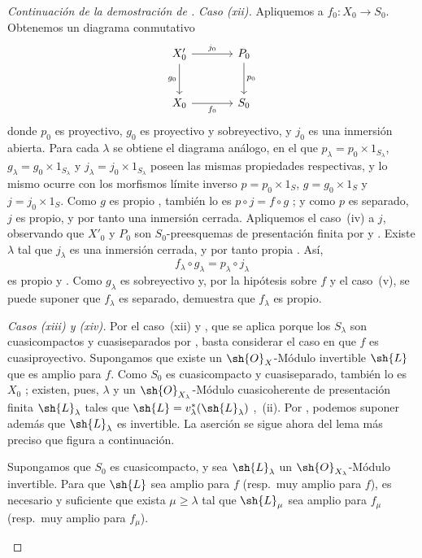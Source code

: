 \begin{proof}[Continuación de la demostración de ]
\emph{Caso (xii).} Apliquemos  a $f_0:X_0\to S_0$. Obtenemos un diagrama conmutativo
\[
\begin{tikzcd}[column sep=large,row sep=large]
X'_0 \arrow[r,"j_0"] \arrow[d,"g_0"'] & P_0 \arrow[d,"p_0"] \\
X_0 \arrow[r,"f_0"'] & S_0
\end{tikzcd}
\]
donde $p_0$ es proyectivo, $g_0$ es proyectivo y sobreyectivo, y $j_0$ es una inmersión abierta. Para cada $\lambda$ se obtiene el diagrama análogo, en el que $p_\lambda=p_0\times1_{S_\lambda}$, $g_\lambda=g_0\times1_{S_\lambda}$ y $j_\lambda=j_0\times1_{S_\lambda}$ poseen las mismas propiedades respectivas, y lo mismo ocurre con los morfismos límite inverso $p=p_0\times1_S$, $g=g_0\times1_S$ y $j=j_0\times1_S$. Como $g$ es propio , también lo es $p\circ j=f\circ g$ ; y como $p$ es separado, $j$ es propio, y por tanto una inmersión cerrada. Apliquemos el caso~(iv) a $j$, observando que $X'_0$ y $P_0$ son $S_0$-preesquemas de presentación finita por  y . Existe $\lambda$ tal que $j_\lambda$ es una inmersión cerrada, y por tanto propia . Así,
\[
  f_\lambda\circ g_\lambda=p_\lambda\circ j_\lambda
\]
es propio  y . Como $g_\lambda$ es sobreyectivo y, por la hipótesis sobre $f$ y el caso~(v), se puede suponer que $f_\lambda$ es separado,  demuestra que $f_\lambda$ es propio.

\emph{Casos (xiii) y (xiv).} Por el caso~(xii) y , que se aplica porque los $S_\lambda$ son cuasicompactos y cuasiseparados por , basta considerar el caso en que $f$ es cuasiproyectivo. Supongamos que existe un $\sh{O}_X$-Módulo invertible $\sh{L}$ que es amplio para $f$. Como $S_0$ es cuasicompacto y cuasiseparado, también lo es $X_0$ ; existen, pues, $\lambda$ y un $\sh{O}_{X_\lambda}$-Módulo cuasicoherente de presentación finita $\sh{L}_\lambda$ tales que $\sh{L}=v_\lambda^*(\sh{L}_\lambda)$ ,~(ii). Por , podemos suponer además que $\sh{L}_\lambda$ es invertible. La aserción se sigue ahora del lema más preciso que figura a continuación.

\begin{lemma}[8.10.5.2]
\label{IV.8.10.5.2}
Supongamos que $S_0$ es cuasicompacto, y sea $\sh{L}_\lambda$ un $\sh{O}_{X_\lambda}$-Módulo invertible. Para que $\sh{L}$ sea amplio para $f$ (resp.\ muy amplio para $f$), es necesario y suficiente que exista $\mu\geqslant\lambda$ tal que $\sh{L}_\mu$ sea amplio para $f_\mu$ (resp.\ muy amplio para $f_\mu$).
\end{lemma}


\end{proof}
